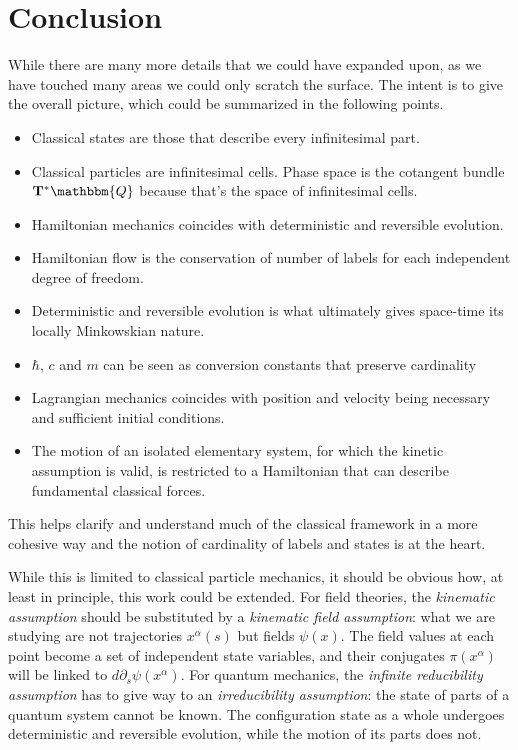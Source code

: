 \documentclass[aps,pra,10pt,twocolumn,floatfix,nofootinbib]{revtex4-1}
\theoremstyle{definition}
\begin{document}
\section{Conclusion}

While there are many more details that we could have expanded upon, as we have touched many areas we could only scratch the surface. The intent is to give the overall picture, which could be summarized in the following points.

\begin{itemize}
  \item Classical states are those that describe every infinitesimal part.
  \item Classical particles are infinitesimal cells. Phase space is the cotangent bundle $\mathbf{T}^*\mathbbm{Q}$ because that's the space of infinitesimal cells.
  \item Hamiltonian mechanics coincides with deterministic and reversible evolution.
  \item Hamiltonian flow is the conservation of number of labels for each independent degree of freedom.
  \item Deterministic and reversible evolution is what ultimately gives space-time its locally Minkowskian nature.
  \item $\hbar$, $c$ and $m$ can be seen as conversion constants that preserve cardinality
  \item Lagrangian mechanics coincides with position and velocity being necessary and sufficient initial conditions.
  \item The motion of an isolated elementary system, for which the kinetic assumption is valid, is restricted to a Hamiltonian that can describe fundamental classical forces.
\end{itemize}

This helps clarify and understand much of the classical framework in a more cohesive way and the notion of cardinality of labels and states is at the heart.

While this is limited to classical particle mechanics, it should be obvious how, at least in principle, this work could be extended. For field theories, the \emph{kinematic assumption} should be substituted by a \emph{kinematic field assumption}: what we are studying are not trajectories $x^\alpha(s)$ but fields $\psi(x)$. The field values at each point become a set of independent state variables, and their conjugates $\pi(x^\alpha)$ will be linked to $d\partial_s\psi(x^\alpha)$. For quantum mechanics, the \emph{infinite reducibility assumption} has to give way to an \emph{irreducibility assumption}: the state of parts of a quantum system cannot be known. The configuration state as a whole undergoes deterministic and reversible evolution, while the motion of its parts does not.
\end{document}
